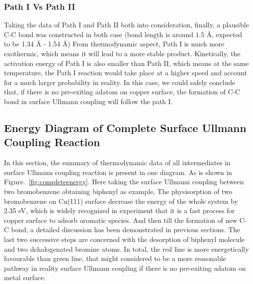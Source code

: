 \documentclass[aps,reprint,amsmath,amssymb]{revtex4-2}
\begin{document}
\subsubsection{Path I Vs Path II}

Taking the data of Path I and Path II both into consideration, finally, a plausible C-C bond was constructed in both case (bond length is around $1.5$ \si{\angstrom}, expected to be 1.34 \si{\angstrom} - 1.54 \si{\angstrom}) From thermodynamic aspect, Path I is much more exothermic, which means it will lead to a more stable product. Kinetically, the activation energy of Path I is also smaller than Path II, which means at the same temperature, the Path I reaction would take place at a higher speed and account for a much larger probability in reality. In this case, we could safely conclude that, if there is no pre-exiting adatom on copper surface, the formation of C-C bond in surface Ullmann coupling will follow the path I.\\

\subsection{Energy Diagram of Complete Surface Ullmann Coupling Reaction}
In this section, the summary of thermodynamic data of all intermediates in surface Ullmann coupling reaction is present in one diagram. As is shown in Figure.~\ref{fig:completeenergy}.
Here taking the surface Ullmann coupling between two bromobenzene obtaining biphenyl as example,
The physisorption of two bromobenzene on Cu(111) surface decrease the energy of the whole system by 2.35 eV, which is widely recognized in experiment that it is a fast process for copper surface to adsorb aromatic species. 
And then till the formation of new C-C bond, a detailed discussion has been demonstrated in previous sections. The last two successive steps are concerned with the desorption of biphenyl molecule and two dehalogenated bromine atoms. 
In total, the red line is more energetically favourable than green line, that might considered to be a more reasonable pathway in reality surface Ullmann coupling if there is no pre-exiting adatom on metal surface.
\end{document}
